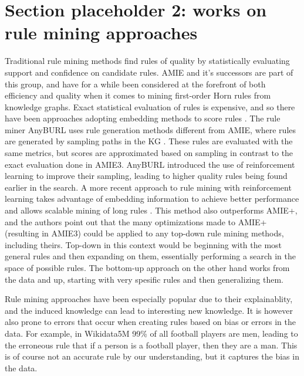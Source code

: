  

\section{Section placeholder 2: works on rule mining approaches}
Traditional rule mining methods find rules of quality by statistically evaluating support and confidence on candidate rules. AMIE and it's successors are part of this group, and have for a while been considered at the forefront of both efficiency and quality when it comes to mining first-order Horn rules from knowledge graphs. Exact statistical evaluation of rules is expensive, and so there have been approaches adopting embedding methods to score rules \cite{yang2014embedding, omran2018scalable, omran2019embedding}. The rule miner AnyBURL uses rule generation methods different from AMIE, where rules are generated by sampling paths in the KG \cite{meilicke2020reinforced}. These rules are evaluated with the same metrics, but scores are approximated based on sampling in contrast to the exact evaluation done in AMIE3. AnyBURL introduced the use of reinforcement learning to improve their sampling, leading to higher quality rules being found earlier in the search. A more recent approach to rule mining with reinforcement learning takes advantage of embedding information to achieve better performance and allows scalable mining of long rules \cite{chen2022rule}. This method also outperforms AMIE+, and the authors point out that the many optimizations made to AMIE+ (resulting in AMIE3) could be applied to any top-down rule mining methods, including theirs. Top-down in this context would be beginning with the most general rules and then expanding on them, essentially performing a search in the space of possible rules. The bottom-up approach on the other hand works from the data and up, starting with very spesific rules and then generalizing them.

Rule mining approaches have been especially popular due to their explainablity, and the induced knowledge can lead to interesting new knowledge. It is however also prone to errors that occur when creating rules based on bias or errors in the data. For example, in Wikidata5M 99\% of all football players are men, leading to the erroneous rule that if a person is a football player, then they are a man. This is of course not an accurate rule by our understanding, but it captures the bias in the data.


